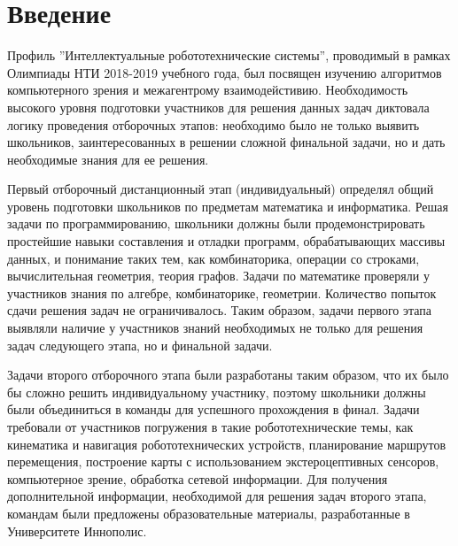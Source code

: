 \documentclass[a4paper,12pt,oneside]{book}
\begin{document}

\setcounter{tocdepth}{1}

\tableofcontents


\chapter{Введение}

Профиль ''Интеллектуальные робототехнические системы'', проводимый в
рамках Олимпиады НТИ 2018-2019 учебного года,  был посвящен изучению
алгоритмов компьютерного зрения и межагентрому взаимодейстивию.
Необходимость высокого уровня подготовки участников для решения данных
задач диктовала логику проведения отборочных  этапов: необходимо было
не только выявить школьников, заинтересованных в решении сложной
финальной задачи, но и дать необходимые знания для ее решения.    

Первый отборочный дистанционный этап (индивидуальный) определял общий
уровень подготовки школьников по предметам математика и информатика. 
Решая задачи по программированию, школьники должны были
продемонстрировать простейшие навыки составления и отладки программ,
обрабатывающих  массивы данных, и понимание таких тем, как
комбинаторика, операции со строками, вычислительная геометрия, теория
графов. Задачи по математике проверяли у участников  знания по
алгебре, комбинаторике, геометрии. Количество попыток сдачи решения
задач не ограничивалось. Таким образом, задачи первого этапа выявляли
наличие у участников знаний необходимых не только для решения задач
следующего этапа, но и финальной задачи.

Задачи второго отборочного этапа были разработаны таким образом, что
их было бы сложно решить индивидуальному участнику, поэтому школьники 
должны были объединиться в команды для успешного прохождения в финал. 
Задачи  требовали от участников погружения  в такие робототехнические
темы, как кинематика и навигация робототехнических устройств,
планирование маршрутов перемещения, построение карты с использованием 
экстероцептивных сенсоров, компьютерное зрение, обработка сетевой
информации. Для получения дополнительной информации, необходимой для
решения задач  второго этапа, командам были предложены образовательные
материалы, разработанные в Университете Иннополис.
\end{document}
